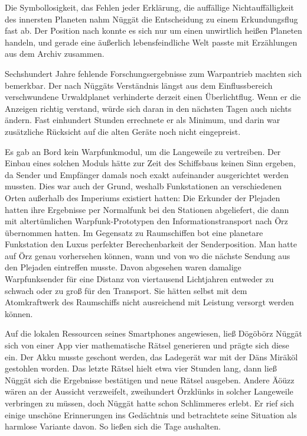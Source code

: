 Die Symbollosigkeit, das Fehlen jeder Erklärung, die auffällige Nichtauffälligkeit des innersten Planeten nahm Nüggät die Entscheidung zu einem Erkundungsflug fast ab. Der Position nach konnte es sich nur um einen unwirtlich heißen Planeten handeln, und gerade eine äußerlich lebensfeindliche Welt passte mit Erzählungen aus dem Archiv zusammen.

Sechshundert Jahre fehlende Forschungsergebnisse zum Warpantrieb machten sich bemerkbar. Der nach Nüggäts Verständnis längst aus dem Einflussbereich verschwundene Urwaldplanet verhinderte derzeit einen Überlichtflug. Wenn er die Anzeigen richtig verstand, würde sich daran in den nächsten Tagen auch nichts ändern. Fast einhundert Stunden errechnete er als Minimum, und darin war zusätzliche Rücksicht auf die alten Geräte noch nicht eingepreist.

Es gab an Bord kein Warpfunkmodul, um die Langeweile zu vertreiben. Der Einbau eines solchen Moduls hätte zur Zeit des Schiffsbaus keinen Sinn ergeben, da Sender und Empfänger damals noch exakt aufeinander ausgerichtet werden mussten. Dies war auch der Grund, weshalb Funkstationen an verschiedenen Orten außerhalb des Imperiums existiert hatten: Die Erkunder der Plejaden hatten ihre Ergebnisse per Normalfunk bei den Stationen abgeliefert, die dann mit altertümlichen Warpfunk-Prototypen den Informationstransport nach Örz übernommen hatten. Im Gegensatz zu Raumschiffen bot eine planetare Funkstation den Luxus perfekter Berechenbarkeit der Senderposition. Man hatte auf Örz genau vorhersehen können, wann und von wo die nächste Sendung aus den Plejaden eintreffen musste. Davon abgesehen waren damalige Warpfunksender für eine Distanz von viertausend Lichtjahren entweder zu schwach oder zu groß für den Transport. Sie hätten selbst mit dem Atomkraftwerk des Raumschiffs nicht ausreichend mit Leistung versorgt werden können.

Auf die lokalen Ressourcen seines Smartphones angewiesen, ließ Dögöbörz Nüggät sich von einer App vier mathematische Rätsel generieren und prägte sich diese ein. Der Akku musste geschont werden, das Ladegerät war mit der Däns Miräköl gestohlen worden. Das letzte Rätsel hielt etwa vier Stunden lang, dann ließ Nüggät sich die Ergebnisse bestätigen und neue Rätsel ausgeben. Andere Äöüzz wären an der Aussicht verzweifelt, zweihundert Örzklünks in solcher Langeweile verbringen zu müssen, doch Nüggät hatte schon Schlimmeres erlebt. Er rief sich einige unschöne Erinnerungen ins Gedächtnis und betrachtete seine Situation als harmlose Variante davon. So ließen sich die Tage aushalten.

